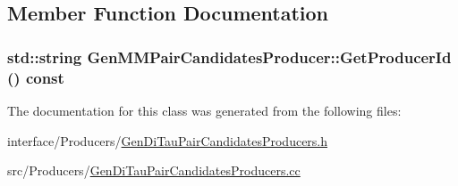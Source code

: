 \subsection{Member Function Documentation}
\hypertarget{classGenMMPairCandidatesProducer_afba80a1c2a111baea0ab42d83dbe787e}{
\subsubsection[{GetProducerId}]{\setlength{\rightskip}{0pt plus 5cm}std::string GenMMPairCandidatesProducer::GetProducerId () const}}
\label{classGenMMPairCandidatesProducer_afba80a1c2a111baea0ab42d83dbe787e}


The documentation for this class was generated from the following files:\begin{DoxyCompactItemize}
\item 
interface/Producers/\hyperlink{GenDiTauPairCandidatesProducers_8h}{GenDiTauPairCandidatesProducers.h}\item 
src/Producers/\hyperlink{GenDiTauPairCandidatesProducers_8cc}{GenDiTauPairCandidatesProducers.cc}\end{DoxyCompactItemize}
